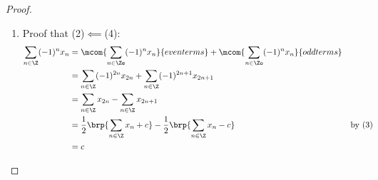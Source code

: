 \begin{proof}
\begin{enumerate}
\begin{enumerate}
      \item Proof that $\ds A+B=\sum_{n\in\Z}x_n$:
        \begin{align*}
          \sum_{n\in\Z}  x_n
            &= \sum_{n\mathrm{\;even}}  x_n  + \sum_{n\mathrm{\;odd}}  x_n
          \\&= \mcom{\sum_{n\in\Z}  x_{2n}}{$A$} + \mcom{\sum_{n\in\Z}  x_{2n+1}}{$B$}
          \\&= A+B
            && \text{by definitions of $A$ and $B$}
        \end{align*}
      
      \item This gives two simultaneous equations:
        \begin{align*}
          A - B &= c \\
          A + B &= \sum_{n\in\Z} x_n
        \end{align*}
      
      \item Solutions to these equations give
        \begin{align*}
         \sum_{n\in\Z}  x_{2n}    &\eqd A &= \frac{1}{2}\brp{\sum_{n\in\Z} x_n + c} \\
         \sum_{n\in\Z}  x_{2n+1}  &\eqd B &= \frac{1}{2}\brp{\sum_{n\in\Z} x_n - c}
        \end{align*}
    \end{enumerate}
  
  \item Proof that (2)$\impliedby$(4):
    \begin{align*}
      \sum_{n\in\Z} (-1)^n  x_n
        &= \mcom{\sum_{n\in\Ze} (-1)^n  x_n}{even terms}
          +\mcom{\sum_{n\in\Zo} (-1)^n  x_n}{odd terms}
      \\&= \sum_{n\in\Z} (-1)^{2n  }  x_{2n} + \sum_{n\in\Z} (-1)^{2n+1}  x_{2n+1}
      \\&= \sum_{n\in\Z}  x_{2n} -\sum_{n\in\Z}  x_{2n+1}
      \\&= \frac{1}{2}\brp{\sum_{n\in\Z}x_n+c} - \frac{1}{2}\brp{\sum_{n\in\Z}x_n-c}
        && \text{by (3)}
      \\&= c
    \end{align*}

\end{enumerate}
\end{proof}




